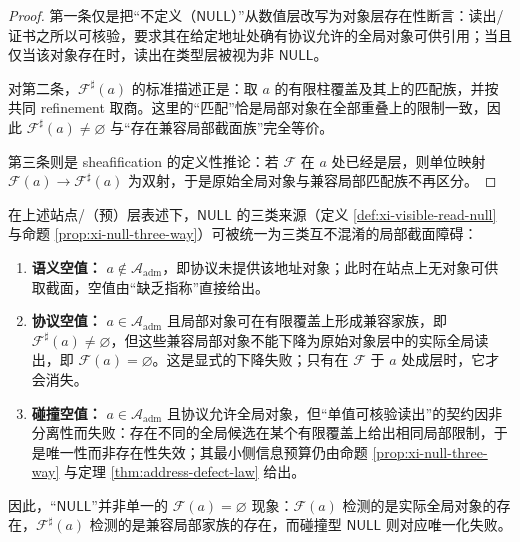 \begin{proof}
第一条仅是把“不定义（\(\mathsf{NULL}\)）”从数值层改写为对象层存在性断言：读出/证书之所以可核验，要求其在给定地址处确有协议允许的全局对象可供引用；当且仅当该对象存在时，读出在类型层被视为非 \(\mathsf{NULL}\)。
\par
对第二条，\(\mathscr{F}^{\sharp}(a)\) 的标准描述正是：取 \(a\) 的有限柱覆盖及其上的匹配族，并按共同 refinement 取商。这里的“匹配”恰是局部对象在全部重叠上的限制一致，因此 \(\mathscr{F}^{\sharp}(a)\neq\varnothing\) 与“存在兼容局部截面族”完全等价。
\par
第三条则是 sheafification 的定义性推论：若 \(\mathscr{F}\) 在 \(a\) 处已经是层，则单位映射 \(\mathscr{F}(a)\to \mathscr{F}^{\sharp}(a)\) 为双射，于是原始全局对象与兼容局部匹配族不再区分。
\end{proof}

\begin{corollary}\label{cor:null-trichotomy-local-section}
在上述站点/（预）层表述下，\(\mathsf{NULL}\) 的三类来源（定义 \ref{def:xi-visible-read-null} 与命题 \ref{prop:xi-null-three-way}）可被统一为三类互不混淆的局部截面障碍：
\begin{enumerate}
  \item \textbf{语义空值：} \(a\notin\mathcal{A}_{\mathrm{adm}}\)，即协议未提供该地址对象；此时在站点上无对象可供取截面，空值由“缺乏指称”直接给出。
  \item \textbf{协议空值：} \(a\in\mathcal{A}_{\mathrm{adm}}\) 且局部对象可在有限覆盖上形成兼容家族，即 \(\mathscr{F}^{\sharp}(a)\neq\varnothing\)，但这些兼容局部对象不能下降为原始对象层中的实际全局读出，即 \(\mathscr{F}(a)=\varnothing\)。这是显式的下降失败；只有在 \(\mathscr{F}\) 于 \(a\) 处成层时，它才会消失。
  \item \textbf{碰撞空值：} \(a\in\mathcal{A}_{\mathrm{adm}}\) 且协议允许全局对象，但“单值可核验读出”的契约因非分离性而失败：存在不同的全局候选在某个有限覆盖上给出相同局部限制，于是唯一性而非存在性失效；其最小侧信息预算仍由命题 \ref{prop:xi-null-three-way} 与定理 \ref{thm:address-defect-law} 给出。
\end{enumerate}
因此，“\(\mathsf{NULL}\)”并非单一的 \(\mathscr{F}(a)=\varnothing\) 现象：\(\mathscr{F}(a)\) 检测的是实际全局对象的存在，\(\mathscr{F}^{\sharp}(a)\) 检测的是兼容局部家族的存在，而碰撞型 \(\mathsf{NULL}\) 则对应唯一化失败。
\end{corollary}

